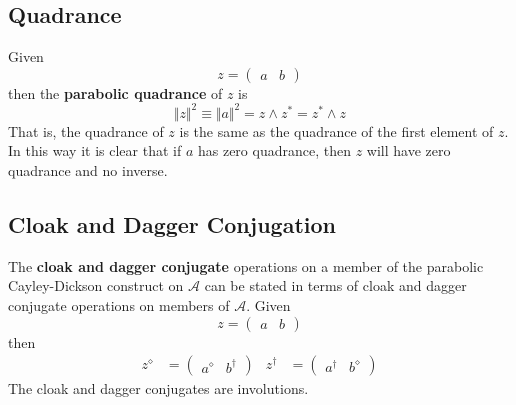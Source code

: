 \subsection{Quadrance}
Given
\begin{equation}
    z = \begin{pmatrix}
        a & b
    \end{pmatrix}
\end{equation}
then the \textbf{parabolic quadrance} of $z$ is
\begin{equation}
    \Vert z \Vert^{2} \equiv \Vert a \Vert^{2} = z \wedge z^{\ast} = z^{\ast} \wedge z
\end{equation}
That is, the quadrance of $z$ is the same as the quadrance of the first element of $z$. In this way it is clear that if $a$ has zero quadrance, then $z$ will have zero quadrance and no inverse.
\subsection{Cloak and Dagger Conjugation}
The \textbf{cloak and dagger conjugate} operations on a member of the parabolic Cayley-Dickson construct on $\mathcal{A}$ can be stated in terms of cloak and dagger conjugate operations on members of $\mathcal{A}$. Given
\begin{equation}
    z = \begin{pmatrix}
        a & b
    \end{pmatrix}
\end{equation}
then
\begin{align}
    z^{\diamond} &= \begin{pmatrix}
        a^{\diamond} & b^{\dagger}
    \end{pmatrix} &
    z^{\dagger} &= \begin{pmatrix}
        a^{\dagger} & b^{\diamond}
    \end{pmatrix}
\end{align}
The cloak and dagger conjugates are involutions. 
